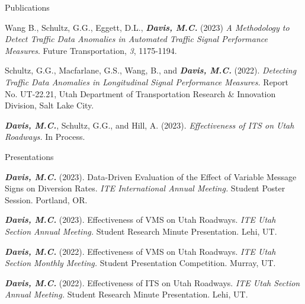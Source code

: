 \documentclass{resume} %
\begin{document}

\begin{rSection}{Publications}

Wang B., Schultz, G.G., Eggett, D.L., {\bf \em Davis, M.C.} (2023) {\em A Methodology to Detect Traffic Data Anomalies in Automated Traffic Signal Performance Measures}. Future Transportation, {\em 3}, 1175-1194.

Schultz, G.G., Macfarlane, G.S., Wang, B., and {\bf \em Davis, M.C.} (2022). {\em Detecting Traffic Data Anomalies in Longitudinal Signal Performance Measures.} Report No. UT-22.21, Utah Department of Transportation Research \& Innovation Division, Salt Lake City.

{\bf \em Davis, M.C.}, Schultz, G.G., and Hill, A. (2023). {\em 
Effectiveness of ITS on Utah Roadways.} In Process.

\end{rSection}


% 
% 
% 
% 

\clearpage
\begin{rSection}{Presentations}

{\bf \em Davis, M.C.} (2023). {Data-Driven Evaluation of the Effect of Variable Message Signs on Diversion Rates.} {\em ITE International Annual Meeting.} Student Poster Session. Portland, OR.

{\bf \em Davis, M.C.} (2023). {Effectiveness of VMS on Utah Roadways.} {\em ITE Utah Section Annual Meeting.} Student Research Minute Presentation. Lehi, UT.

{\bf \em Davis, M.C.} (2022). {Effectiveness of VMS on Utah Roadways.} {\em ITE Utah Section Monthly Meeting.} Student Presentation Competition. Murray, UT.

{\bf \em Davis, M.C.} (2022). {Effectiveness of ITS on Utah Roadways.} {\em ITE Utah Section Annual Meeting.} Student Research Minute Presentation. Lehi, UT. 

\end{rSection}
\end{document}
